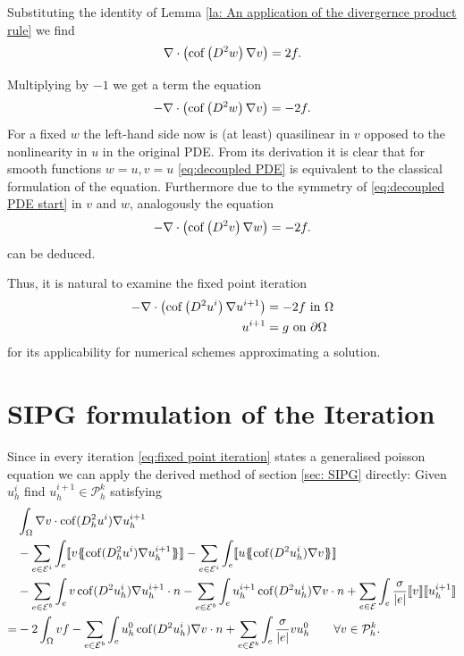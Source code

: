 Substituting the identity of Lemma \ref{la: An application of the divergernce product rule} we find
\begin{align}
	\nabla \cdot \left( \operatorname{cof} \left( D^2 w  \right) \nabla v \right) = 2f.
\end{align}


Multiplying by $-1$ we get a term the equation
\begin{align}
	- \nabla \cdot \left( \operatorname{cof} \left(  D^2 w \right) \nabla v \right)  = -2f.  \label{eq:decoupled PDE}
\end{align}
For a fixed $w$ the left-hand side now is (at least) quasilinear in $v$ opposed to the nonlinearity in $u$ in the original PDE. From its derivation it is clear that for smooth functions $w=u, v=u$ \eqref{eq:decoupled PDE} is equivalent to the classical formulation of the \MA equation. Furthermore due to the symmetry of \eqref{eq:decoupled PDE start} in $v$ and $w$, analogously the equation 
\begin{align}
	- \nabla \cdot \left( \operatorname{cof} \left(  D^2 v \right) \nabla w \right)  = -2f.  \label{eq:decoupled PDE two}
\end{align}
can be deduced.

Thus, it is natural to examine the fixed point iteration
\begin{align}
	\begin{split}
	- \nabla \cdot \left( \operatorname{cof} \left(  D^2 u^i \right) \nabla u^{i+1} \right)  &= -2f  \text{ in } \Omega \\
		u^{i+1} &= g \textnormal{ on } \partial \Omega
	\label{eq:fixed point iteration}
	\end{split}
\end{align}
for its applicability for numerical schemes approximating a \MA solution.

\section{SIPG formulation of the Iteration}\label{sec: SIPG MA}
Since in every iteration \eqref{eq:fixed point iteration} states a generalised poisson equation we can apply the derived  method of section \ref{sec: SIPG} directly: Given $u^i_h$ find $u^{i+1}_h \in \mathcal P^k_h$ satisfying
\begin{align}
 &\int_{\Omega} \nabla v \cdot \cof(D_h^2 u^{i}) \nabla u_h^{i+1}\\
 & -\sum\limits_{e \in \bigEps^i}\int_{e} \jump {v \average { \cof(D_h^2 u^{i}) \nabla u_h^{i+1}} }
 - \sum\limits_{e \in \bigEps^i}\int_{e} \jump {u \average{ \cof(D^2 u_h^{i}) \nabla v} } \\  
 & - \sum\limits_{e \in \bigEps^b}\int_{e} v \cof(D^2 u_h^{i}) \nabla u_h^{i+1}\cdot n 
    - \sum\limits_{e \in \bigEps^b}\int_{e} u_h^{i+1}\cof(D^2 u_h^{i}) \nabla v \cdot n
    +\sum\limits_{e \in \bigEps} \int_e \frac \sigma {|e|} \jump v  \jump {u_h^{i+1}}\\
    =& - 2 \int_{\Omega}v f
    	 				-\sum\limits_{e \in \bigEps^b}\int_{e} u_h^0 \cof(D^2 u_h^{i}) \nabla v \cdot n 
    	 				+\sum\limits_{e \in \bigEps^b} \int_e \frac \sigma {|e|} v u_h^0    \qquad \forall v \in  \mathcal P^k_h.
    	\label{eq: sipg iteration}
\end{align}


